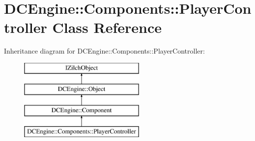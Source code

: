 \hypertarget{classDCEngine_1_1Components_1_1PlayerController}{\section{D\-C\-Engine\-:\-:Components\-:\-:Player\-Controller Class Reference}
\label{classDCEngine_1_1Components_1_1PlayerController}
}
Inheritance diagram for D\-C\-Engine\-:\-:Components\-:\-:Player\-Controller\-:\begin{figure}[H]
\begin{center}
\leavevmode
\includegraphics[height=4.000000cm]{classDCEngine_1_1Components_1_1PlayerController}
\end{center}
\end{figure}
